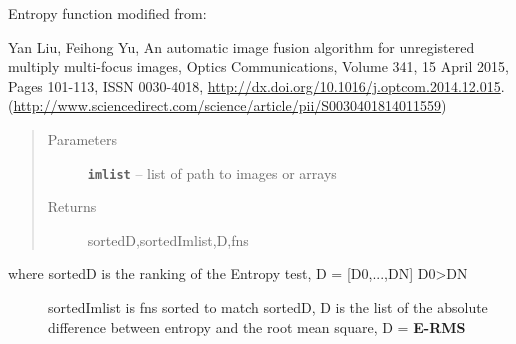 \documentclass[letterpaper,10pt,english]{sphinxmanual}
\begin{document}
\begin{fulllineitems}
\label{RRtoolbox.tools:RRtoolbox.tools.selectors.entropy}
Entropy function modified from:

Yan Liu, Feihong Yu, An automatic image fusion algorithm for unregistered multiply multi-focus images,
Optics Communications, Volume 341, 15 April 2015, Pages 101-113, ISSN 0030-4018,
\href{http://dx.doi.org/10.1016/j.optcom.2014.12.015}{http://dx.doi.org/10.1016/j.optcom.2014.12.015}.
(\href{http://www.sciencedirect.com/science/article/pii/S0030401814011559}{http://www.sciencedirect.com/science/article/pii/S0030401814011559})
\begin{quote}\begin{description}
\item[{Parameters}] \leavevmode
\textbf{\texttt{imlist}} -- list of path to images or arrays

\item[{Returns}] \leavevmode
sortedD,sortedImlist,D,fns

\end{description}\end{quote}
\begin{description}
\item[{where sortedD is the ranking of the Entropy test, D = {[}D0,...,DN{]} D0\textgreater{}DN}] \leavevmode
sortedImlist is fns sorted to match sortedD,
D is the list of the absolute difference between entropy and the root mean square, D = {\color{red}\bfseries{}\textbar{}E-RMS\textbar{}}

\end{description}

\end{fulllineitems}

\end{document}
